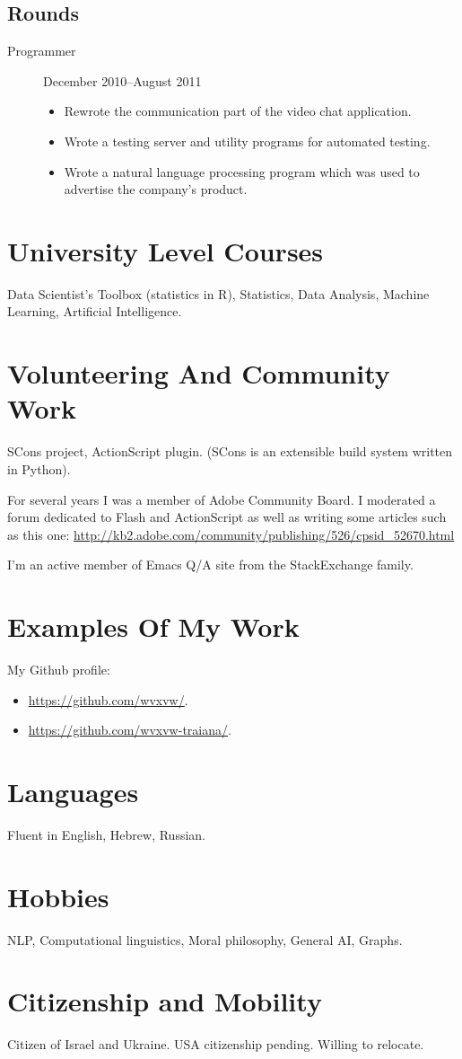 \documentclass[11pt]{article}
\begin{document}
\subsection*{Rounds}
\label{sec:orgd2277e7}
\begin{description}
\item[{Programmer}] December 2010--August 2011
\begin{itemize}
\item Rewrote the communication part of the video chat application.
\item Wrote a testing server and utility programs for automated
testing.
\item Wrote a natural language processing program which was used
to advertise the company's product.
\end{itemize}
\end{description}

\section*{University Level Courses}
\label{sec:orgd4266a3}
Data Scientist's Toolbox (statistics in R), Statistics, Data
Analysis, Machine Learning, Artificial Intelligence.

\section*{Volunteering And Community Work}
\label{sec:orgd192044}
SCons project, ActionScript plugin.  (SCons is an extensible build system
written in Python).

For several years I was a member of Adobe Community Board. I moderated a forum
dedicated to Flash and ActionScript as well as writing some articles such as
this one: \url{http://kb2.adobe.com/community/publishing/526/cpsid\_52670.html}

I'm an active member of Emacs Q/A site from the StackExchange family.

\section*{Examples Of My Work}
\label{sec:org92831ab}
My Github profile:
\begin{itemize}
\item \url{https://github.com/wvxvw/}.
\item \url{https://github.com/wvxvw-traiana/}.
\end{itemize}

\section*{Languages}
\label{sec:org8348956}
Fluent in English, Hebrew, Russian.

\section*{Hobbies}
\label{sec:orgd9edeaf}
NLP, Computational linguistics, Moral philosophy, General AI, Graphs.

\section*{Citizenship and Mobility}
\label{sec:org805bc4c}
Citizen of Israel and Ukraine.  USA citizenship pending.  Willing
to relocate.
\end{document}
